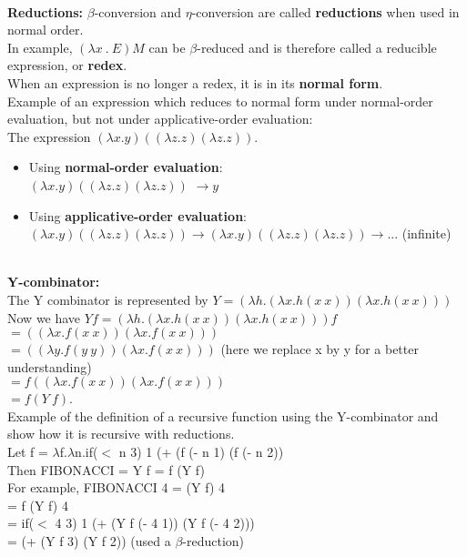 \documentclass[11pt]{article}
\begin{document}
\\ \textbf{Reductions:}
$\beta$-conversion and $\eta$-conversion are called \textbf{reductions} when used in normal order.
\\ In example, $(\lambda x\ .\ E)M$ can be $\beta$-reduced and is therefore called a reducible expression, or \textbf{redex}.
\\ When an expression is no longer a redex, it is in its \textbf{normal form}.
\\ Example of an expression which reduces to normal form under normal-order evaluation, but not under applicative-order evaluation:
\\ The expression $(\lambda x.y)((\lambda z.z)(\lambda z.z))$.
\begin{itemize}
    \item Using \textbf{normal-order evaluation}:
    \\ $(\lambda x.y)((\lambda z.z)(\lambda z.z))$
    $\rightarrow y$
    \item Using \textbf{applicative-order evaluation}:
    \\ $(\lambda x.y)((\lambda z.z)(\lambda z.z))
    \rightarrow (\lambda x.y)((\lambda z.z)(\lambda z.z)) \rightarrow ... $ (infinite) 
\end{itemize}
\\ \textbf{Y-combinator:}
\\ The Y combinator is represented by 
$Y = (\lambda h.(\lambda x . h(x\ x))(\lambda x.h(x\ x)))$
\\ Now we have $Y f = (\lambda h.(\lambda x . h(x\ x))(\lambda x.h(x\ x))) f$
\\ $ = ((\lambda x . f(x\ x))(\lambda x.f(x\ x)))$
\\ $ = ((\lambda y . f(y\ y))(\lambda x.f(x\ x)))$ (here we replace x by y for a better understanding)
\\ $ = f ((\lambda x . f(x\ x))(\lambda x.f(x\ x)))$
\\ $ = f (Y\ f)$.
\\ Example of the definition of a recursive function using the Y-combinator and show how it is recursive with reductions.
\\ Let f = $\lambda$f.$\lambda$n.if($<$ n 3) 1 (+ (f (- n 1) (f (- n 2))
\\ Then FIBONACCI = Y f = f (Y f)
\\ For example, FIBONACCI 4 = (Y f) 4
\\ = f (Y f) 4
\\ = if($<$ 4 3) 1 (+ (Y f (- 4 1)) (Y f (- 4 2)))
\\ = (+ (Y f 3) (Y f 2)) (used a $\beta$-reduction)
\end{document}
